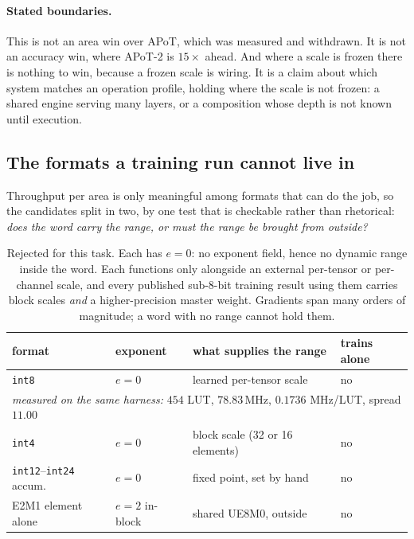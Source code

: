 \documentclass[11pt]{article}
\theoremstyle{definition}
\begin{document}
\paragraph{Stated boundaries.} This is not an area win over APoT, which was
measured and withdrawn. It is not an accuracy win, where APoT-2 is $15\times$
ahead. And where a scale is frozen there is nothing to win, because a frozen
scale is wiring. It is a claim about which system matches an operation profile,
holding where the scale is not frozen: a shared engine serving many layers, or a
composition whose depth is not known until execution.


\subsection{The formats a training run cannot live in}
\label{sec:untrainable}

Throughput per area is only meaningful among formats that can do the job, so the
candidates split in two, by one test that is checkable rather than rhetorical:
\emph{does the word carry the range, or must the range be brought from outside?}

\begin{table}[t]\centering
\caption{Rejected for this task. Each has $e=0$: no exponent field, hence no
dynamic range inside the word. Each functions only alongside an external
per-tensor or per-channel scale, and every published sub-8-bit training result
using them carries block scales \emph{and} a higher-precision master weight.
Gradients span many orders of magnitude; a word with no range cannot hold them.}
\label{tab:rejected}
\begin{tabular}{llll}
\toprule
format & exponent & what supplies the range & trains alone \\
\midrule
\texttt{int8} & $e=0$ & learned per-tensor scale & no \\
\multicolumn{4}{l}{\quad\emph{measured on the same harness:} $454$ LUT, $78.83$\,MHz, $0.1736$ MHz/LUT, spread $11.00$} \\
\texttt{int4} & $e=0$ & block scale (32 or 16 elements) & no \\
\texttt{int12}--\texttt{int24} accum. & $e=0$ & fixed point, set by hand & no \\
E2M1 element alone & $e=2$ in-block & shared UE8M0, outside & no \\
\bottomrule
\end{tabular}
\end{table}
\end{document}
